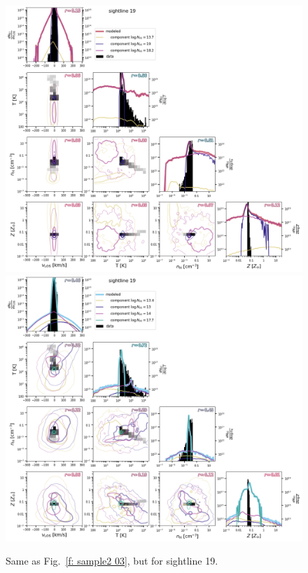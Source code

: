 \documentclass[fleqn,usenatbib]{mnras}
\begin{document}
\begin{figure}
    \centering
    \includegraphics[height=0.45\textheight]{figures/sample2/original/sightline_0019.png}
    \includegraphics[height=0.45\textheight]{figures/sample2/high-z/sightline_0019.png}
    \label{f: sample2 19}
    \caption{Same as Fig.~\ref{f: sample2 03}, but for sightline 19.}
\end{figure}
\end{document}

